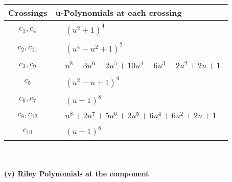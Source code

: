 \documentclass[1p]{elsarticle_modified}
\theoremstyle{definition}
\begin{document}
\begin{tabular}{m{50pt}|m{274pt}}
Crossings & \hspace{64pt}u-Polynomials at each crossing \\
\hline $$\begin{aligned}c_{1},c_{4}\end{aligned}$$&$\begin{aligned}
&(u^2+1)^4
\end{aligned}$\\
\hline $$\begin{aligned}c_{2},c_{11}\end{aligned}$$&$\begin{aligned}
&(u^4- u^2+1)^2
\end{aligned}$\\
\hline $$\begin{aligned}c_{3},c_{9}\end{aligned}$$&$\begin{aligned}
&u^8-3 u^6-2 u^5+10 u^4-6 u^3-2 u^2+2 u+1
\end{aligned}$\\
\hline $$\begin{aligned}c_{5}\end{aligned}$$&$\begin{aligned}
&(u^2- u+1)^4
\end{aligned}$\\
\hline $$\begin{aligned}c_{6},c_{7}\end{aligned}$$&$\begin{aligned}
&(u-1)^8
\end{aligned}$\\
\hline $$\begin{aligned}c_{8},c_{12}\end{aligned}$$&$\begin{aligned}
&u^8+2 u^7+5 u^6+2 u^5+6 u^4+6 u^2+2 u+1
\end{aligned}$\\
\hline $$\begin{aligned}c_{10}\end{aligned}$$&$\begin{aligned}
&(u+1)^8
\end{aligned}$\\
\hline
\end{tabular}\\~\\
\newpage\renewcommand{\arraystretch}{1}
\flushleft \textbf{(v) Riley Polynomials at the component}\newline \\
\end{document}

